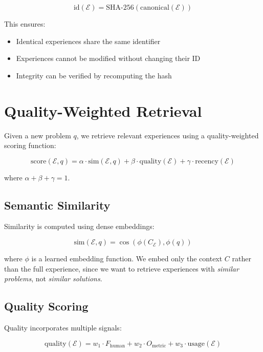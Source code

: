 \documentclass[11pt,letterpaper]{article}
\begin{document}
\begin{equation}
\text{id}(\mathcal{E}) = \text{SHA-256}(\text{canonical}(\mathcal{E}))
\end{equation}

This ensures:
\begin{itemize}
    \item Identical experiences share the same identifier
    \item Experiences cannot be modified without changing their ID
    \item Integrity can be verified by recomputing the hash
\end{itemize}

\section{Quality-Weighted Retrieval}
\label{sec:retrieval}

Given a new problem $q$, we retrieve relevant experiences using a quality-weighted scoring function:

\begin{equation}
\text{score}(\mathcal{E}, q) = \alpha \cdot \text{sim}(\mathcal{E}, q) + \beta \cdot \text{quality}(\mathcal{E}) + \gamma \cdot \text{recency}(\mathcal{E})
\end{equation}

where $\alpha + \beta + \gamma = 1$.

\subsection{Semantic Similarity}

Similarity is computed using dense embeddings:

\begin{equation}
\text{sim}(\mathcal{E}, q) = \cos(\phi(C_\mathcal{E}), \phi(q))
\end{equation}

where $\phi$ is a learned embedding function. We embed only the context $C$ rather than the full experience, since we want to retrieve experiences with \emph{similar problems}, not \emph{similar solutions}.

\subsection{Quality Scoring}

Quality incorporates multiple signals:

\begin{equation}
\text{quality}(\mathcal{E}) = w_1 \cdot F_{\text{human}} + w_2 \cdot O_{\text{metric}} + w_3 \cdot \text{usage}(\mathcal{E})
\end{equation}
\end{document}
